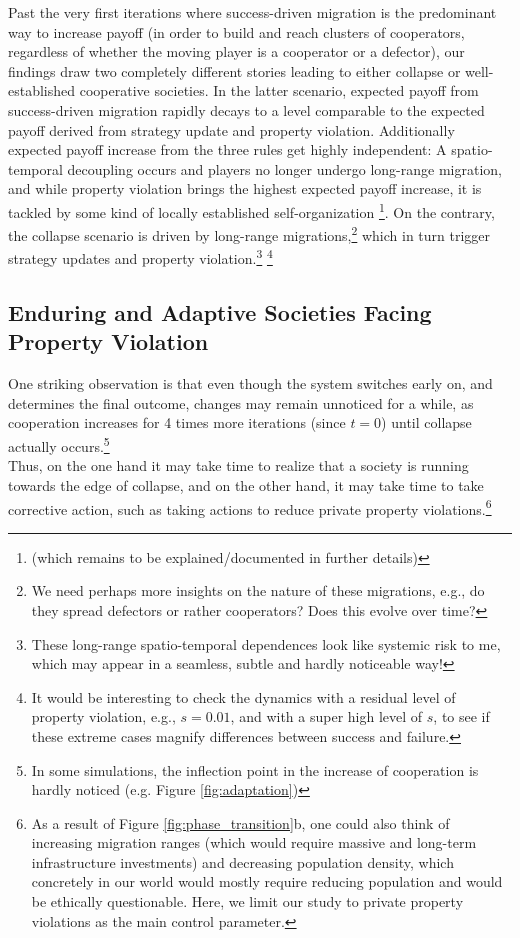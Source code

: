 Past the very first iterations where success-driven migration is the predominant way to increase payoff (in order to build and reach clusters of cooperators, regardless of whether the moving player is a cooperator or a defector), our findings draw two completely different stories leading to either collapse or well-established cooperative societies. In the latter scenario, expected payoff from success-driven migration rapidly decays to a level comparable to the expected payoff derived from strategy update and property violation. Additionally expected payoff increase from the three rules get highly independent: A spatio-temporal decoupling occurs and players no longer undergo long-range migration, and while property violation brings the highest expected payoff increase, it is tackled by some kind of locally established self-organization \footnote{(which remains to be explained/documented in further details)}. On the contrary, the collapse scenario is driven by long-range migrations,\footnote{We need perhaps more insights on the nature of these migrations, e.g., do they spread defectors or rather cooperators? Does this evolve over time?} which in turn trigger strategy updates and property violation.\footnote{These long-range spatio-temporal dependences look like systemic risk to me, which may appear in a seamless, subtle and hardly noticeable way!} \footnote{It would be interesting to check the dynamics with a residual level of property violation, e.g., $s=0.01$, and with a super high level of $s$, to see if these extreme cases magnify differences between success and failure.}

\subsection*{Enduring and Adaptive Societies Facing Property Violation}
One striking observation is that even though the system switches early on, and determines the final outcome, changes may remain unnoticed for a while, as cooperation increases for 4 times more iterations (since $t=0$) until collapse actually occurs.\footnote{In some simulations, the inflection point in the increase of cooperation is hardly noticed (e.g. Figure \ref{fig:adaptation})}\\

Thus, on the one hand it may take time to realize that a society is running towards the edge of collapse, and on the other hand, it may take time to take corrective action, such as taking actions to reduce private property violations.\footnote{As a result of Figure \ref{fig:phase_transition}b, one could also think of increasing migration ranges (which would require massive and long-term infrastructure investments) and decreasing population density, which concretely in our world would mostly require reducing population and would be ethically questionable. Here, we limit our study to private property violations as the main control parameter.}\\

